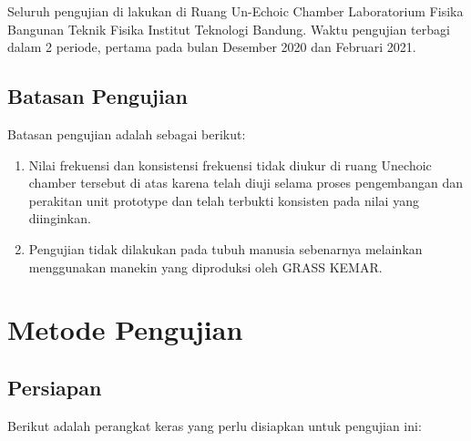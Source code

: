 \documentclass[12pt,]{article}
\begin{document}
	Seluruh pengujian di lakukan di Ruang Un-Echoic Chamber Laboratorium Fisika Bangunan Teknik Fisika
	Institut Teknologi Bandung. Waktu pengujian terbagi dalam 2 periode, pertama pada bulan Desember 2020 dan Februari 2021.

	\subsection{Batasan Pengujian}

	Batasan pengujian adalah sebagai berikut:

	\begin{enumerate}
		\item Nilai frekuensi dan konsistensi frekuensi tidak diukur di ruang Unechoic chamber tersebut di atas
		karena telah diuji selama proses pengembangan dan perakitan unit prototype dan telah terbukti konsisten pada nilai yang diinginkan.

		\item Pengujian tidak dilakukan pada tubuh manusia sebenarnya melainkan menggunakan manekin yang diproduksi oleh GRASS KEMAR.
	\end{enumerate}


	\newpage
	\section{Metode Pengujian}

	\subsection{Persiapan}

	Berikut adalah perangkat keras yang perlu disiapkan untuk pengujian ini:
\end{document}
